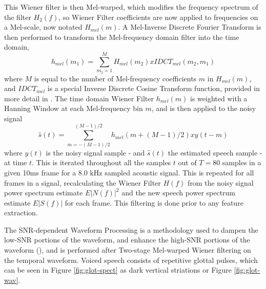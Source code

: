 This Wiener filter is then Mel-warped, which modifies the frequency spectrum of the filter $H_2(f)$, so Wiener Filter coefficients are now applied to frequencies on a Mel-scale, now notated $H_{mel}(m)$.  A Mel-Inverse Discrete Fourier Transform is then performed to transform the Mel-frequency domain filter into the time domain, \begin{equation} h_{mel}(m_1) = \sum_{m_2=1}^{M} H_{mel}(m_2) x IDCT_{mel}(m_2,m_1) \end{equation} where $M$ is equal to the number of Mel-frequency coefficients $m$ in $H_{mel}(m)$, and $IDCT_{mel}$ is a special Inverse Discrete Cosine Transform function, provided in more detail in \cite{etsi:02}.  The time domain Wiener Filter $h_{mel}(m)$ is weighted with a Hanning Window at each Mel-frequency bin $m$, and is then applied to the noisy signal \begin{equation} \hat{s}(t) = \sum_{m=-(M-1)/2}^{(M-1)/2} h_{mel}(m+(M-1)/2) x y(t-m) \end{equation} where $y(t)$ is the noisy signal sample - and $\hat{s}(t)$ the estimated speech sample - at time $t$.  This is iterated throughout all the samples $t$ out of $T=80$ samples in a given 10ms frame for a 8.0 kHz sampled acoustic signal.  This is repeated for all frames in a signal, recalculating the Wiener Filter $H(f)$ from the noisy signal power spectrum estimate $E|N(f)|^2$ and the new speech power spectrum estimate $E|S(f)|$ for each frame.  This filtering is done prior to any feature extraction.

The SNR-dependent Waveform Processing is a methodology used to dampen the low-SNR portions of the waveform, and enhance the high-SNR portions of the waveform (\cite{macho:01}), and is performed after Two-stage Mel-warped Wiener filtering on the temporal waveform.  Voiced speech consists of repetitive glottal pulses, which can be seen in Figure \ref{fig:glot-spect} as dark vertical striations or Figure \ref{fig:glot-wav}.


